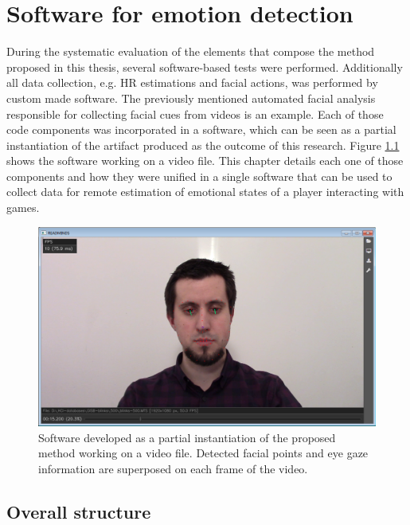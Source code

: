 \chapter{Software for emotion detection}
\label{ch:software}

During the systematic evaluation of the elements that compose the method proposed in this thesis, several software-based tests were performed. Additionally all data collection, e.g. HR estimations and facial actions, was performed by custom made software. The previously mentioned automated facial analysis responsible for collecting facial cues from videos is an example. Each of those code components was incorporated in a software, which can be seen as a partial instantiation of the artifact produced as the outcome of this research. Figure \ref{fig:readmind-main-window} shows the software working on a video file. This chapter details each one of those components and how they were unified in a single software that can be used to collect data for remote estimation of emotional states of a player interacting with games.

\begin{figure}[h!]
    \centering
    \includegraphics[width=\textwidth]{Content/figures/tool-main-window.png}
    \caption{Software developed as a partial instantiation of the proposed method working on a video file. Detected facial points and eye gaze information are superposed on each frame of the video.}
    \label{fig:readmind-main-window}
\end{figure}

\section{Overall structure}

